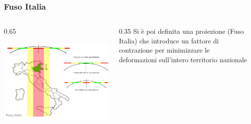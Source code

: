 \documentclass{beamer}
\begin{document}
{\begin{frame}
\frametitle{Fuso Italia}
 \begin{columns}
 	\begin{column} {0.65\textwidth}
 		\begin{center}
 			\includegraphics[width=1\textwidth] {./pics/proiezione1_FI.PNG}
 		\end{center}
 	\end{column}
	\begin{column} {0.35\textwidth}
		Si è poi definita una proiezione (Fuso Italia) che introduce un fattore di contrazione per minimizzare le deformazioni sull'intero territorio nazionale
	\end{column}
 \end{columns}
\end{frame}

}
\end{document}
